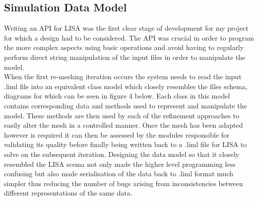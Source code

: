 \subsection{Simulation Data Model}
Writing an API for LISA was the first clear stage of development for my project for which a design had to be considered. The API was crucial in order to program the more complex aspects using basic operations and avoid having to regularly perform direct string manipulation of the input files in order to manipulate the model. \\

\noindent
When the first re-meshing iteration occurs the system needs to read the input .liml file into an equivalent class model which closely resembles the files schema, diagrams for which can be seen in figure 4 below. Each class in this model contains corresponding data and methods used to represent and manipulate the model. These methods are then used by each of the refinement approaches to easily alter the mesh in a controlled manner. Once the mesh  has been adapted however is required it can then be assessed by the modules responsible for validating its quality before finally being written back to a .liml file for LISA to solve on the subsequent iteration. Designing the data model so that it closely resembled the LISA scema not only made the higher level programming less confusing but also made serialisation of the data back to .liml format much simpler  thus reducing the number of bugs arising from inconsistencies between different representations of the same data. \\

